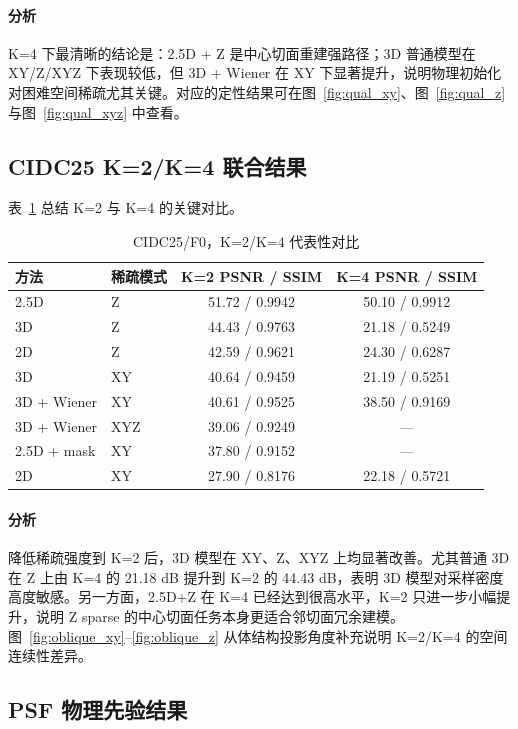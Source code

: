 \documentclass[UTF8, scheme=plain, 11pt, a4paper]{ctexart}
\begin{document}
\paragraph{分析}
K=4 下最清晰的结论是：2.5D + Z 是中心切面重建强路径；3D 普通模型在 XY/Z/XYZ 下表现较低，但 3D + Wiener 在 XY 下显著提升，说明物理初始化对困难空间稀疏尤其关键。对应的定性结果可在图~\ref{fig:qual_xy}、图~\ref{fig:qual_z} 与图~\ref{fig:qual_xyz} 中查看。

\subsection{CIDC25 K=2/K=4 联合结果}

表~\ref{tab:cidc25_k2k4} 总结 K=2 与 K=4 的关键对比。

\begin{table}[H]
  \centering
  \caption{CIDC25/F0，K=2/K=4 代表性对比}
  \label{tab:cidc25_k2k4}
  \begin{tabular}{llcc}
    \toprule
    方法 & 稀疏模式 & K=2 PSNR / SSIM & K=4 PSNR / SSIM \\
    \midrule
    2.5D & Z & 51.72 / 0.9942 & 50.10 / 0.9912 \\
    3D & Z & 44.43 / 0.9763 & 21.18 / 0.5249 \\
    2D & Z & 42.59 / 0.9621 & 24.30 / 0.6287 \\
    3D & XY & 40.64 / 0.9459 & 21.19 / 0.5251 \\
    3D + Wiener & XY & 40.61 / 0.9525 & 38.50 / 0.9169 \\
    3D + Wiener & XYZ & 39.06 / 0.9249 & --- \\
    2.5D + mask & XY & 37.80 / 0.9152 & --- \\
    2D & XY & 27.90 / 0.8176 & 22.18 / 0.5721 \\
    \bottomrule
  \end{tabular}
\end{table}

\paragraph{分析}
降低稀疏强度到 K=2 后，3D 模型在 XY、Z、XYZ 上均显著改善。尤其普通 3D 在 Z 上由 K=4 的 21.18 dB 提升到 K=2 的 44.43 dB，表明 3D 模型对采样密度高度敏感。另一方面，2.5D+Z 在 K=4 已经达到很高水平，K=2 只进一步小幅提升，说明 Z sparse 的中心切面任务本身更适合邻切面冗余建模。图~\ref{fig:oblique_xy}--\ref{fig:oblique_z} 从体结构投影角度补充说明 K=2/K=4 的空间连续性差异。

\subsection{PSF 物理先验结果}
\end{document}
